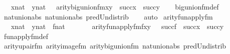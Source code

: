 \begin{isabellebody}
\ \ {\isachardoublequoteopen}{\isasymlbrakk}\ x{\isasymin}nat\ {\isacharsemicolon}{\kern0pt}\ y{\isasymin}nat\ {\isasymrbrakk}\ {\isasymLongrightarrow}\ arity{\isacharparenleft}{\kern0pt}big{\isacharunderscore}{\kern0pt}union{\isacharunderscore}{\kern0pt}fm{\isacharparenleft}{\kern0pt}x{\isacharcomma}{\kern0pt}y{\isacharparenright}{\kern0pt}{\isacharparenright}{\kern0pt}\ {\isacharequal}{\kern0pt}\ succ{\isacharparenleft}{\kern0pt}x{\isacharparenright}{\kern0pt}\ {\isasymunion}\ succ{\isacharparenleft}{\kern0pt}y{\isacharparenright}{\kern0pt}{\isachardoublequoteclose}\isanewline
%
\isadelimproof
\ \ %
\endisadelimproof
%
\isatagproof
{}\isamarkupfalse%
\ big{\isacharunderscore}{\kern0pt}union{\isacharunderscore}{\kern0pt}fm{\isacharunderscore}{\kern0pt}def\isanewline
\ \ \isamarkupfalse%
\ nat{\isacharunderscore}{\kern0pt}union{\isacharunderscore}{\kern0pt}abs{}\ nat{\isacharunderscore}{\kern0pt}union{\isacharunderscore}{\kern0pt}abs{}\ pred{\isacharunderscore}{\kern0pt}Un{\isacharunderscore}{\kern0pt}distrib\isanewline
\ \ \isamarkupfalse%
\ auto%
\endisatagproof
{\isafoldproof}%
%
\isadelimproof
\isanewline
%
\endisadelimproof
\isanewline
{}\isamarkupfalse%
\ arity{\isacharunderscore}{\kern0pt}fun{\isacharunderscore}{\kern0pt}apply{\isacharunderscore}{\kern0pt}fm\ {\isacharcolon}{\kern0pt}\ \isanewline
\ \ {\isachardoublequoteopen}{\isasymlbrakk}\ x{\isasymin}nat\ {\isacharsemicolon}{\kern0pt}\ y{\isasymin}nat\ {\isacharsemicolon}{\kern0pt}\ f{\isasymin}nat\ {\isasymrbrakk}\ {\isasymLongrightarrow}\ \isanewline
\ \ \ \ arity{\isacharparenleft}{\kern0pt}fun{\isacharunderscore}{\kern0pt}apply{\isacharunderscore}{\kern0pt}fm{\isacharparenleft}{\kern0pt}f{\isacharcomma}{\kern0pt}x{\isacharcomma}{\kern0pt}y{\isacharparenright}{\kern0pt}{\isacharparenright}{\kern0pt}\ {\isacharequal}{\kern0pt}\ \ succ{\isacharparenleft}{\kern0pt}f{\isacharparenright}{\kern0pt}\ {\isasymunion}\ succ{\isacharparenleft}{\kern0pt}x{\isacharparenright}{\kern0pt}\ {\isasymunion}\ succ{\isacharparenleft}{\kern0pt}y{\isacharparenright}{\kern0pt}{\isachardoublequoteclose}\isanewline
%
\isadelimproof
\ \ %
\endisadelimproof
%
\isatagproof
{}\isamarkupfalse%
\ fun{\isacharunderscore}{\kern0pt}apply{\isacharunderscore}{\kern0pt}fm{\isacharunderscore}{\kern0pt}def\isanewline
\ \ \isamarkupfalse%
\ arity{\isacharunderscore}{\kern0pt}upair{\isacharunderscore}{\kern0pt}fm\ arity{\isacharunderscore}{\kern0pt}image{\isacharunderscore}{\kern0pt}fm\ arity{\isacharunderscore}{\kern0pt}big{\isacharunderscore}{\kern0pt}union{\isacharunderscore}{\kern0pt}fm\ nat{\isacharunderscore}{\kern0pt}union{\isacharunderscore}{\kern0pt}abs{}\ pred{\isacharunderscore}{\kern0pt}Un{\isacharunderscore}{\kern0pt}distrib\isanewline

\end{isabellebody}
